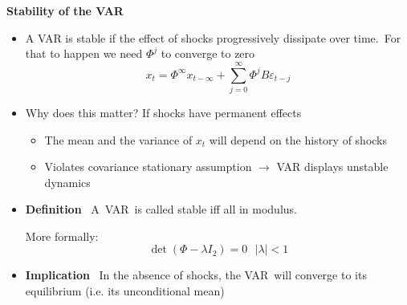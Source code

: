 \documentclass[10pt,english,t,aspectratio=169,ignorenonframetext]{beamer}
\begin{document}

\begin{frame}
{\textbf{Stability of the VAR}}\vspace{-.2cm}

\begin{itemize}
\item A VAR is stable if the effect of shocks progressively dissipate over
time.\ For that to happen we need $\Phi ^{j}$ to converge to zero 
\begin{equation*}
x_{t}=\Phi ^{\infty }x_{t-\infty }+\sum\limits_{j=0}^{\infty }\Phi
^{j}B\varepsilon _{t-j}
\end{equation*}%
\vspace{-0.15cm}

\item Why does this matter? If shocks have permanent effects\smallskip 

\begin{itemize}
\item The mean and the variance of $x_{t}$ will depend on the history of
shocks\medskip 

\item Violates covariance stationary assumption $\rightarrow $ VAR displays
unstable dynamics \bigskip \pause
\end{itemize}

\item \textbf{Definition} \ A\ VAR\ is called stable iff all {%
} in modulus.%
\pause\newline More formally: 
\begin{equation*}
\det \left( \Phi -\lambda I_{2}\right) =0\ \ \ \left\vert \lambda
\right\vert <1
\end{equation*}%
\pause

\item \textbf{Implication} \ In the absence of shocks, the VAR\ will
converge to its equilibrium (i.e. its unconditional mean)
\end{itemize}
\end{frame}

\end{document}
